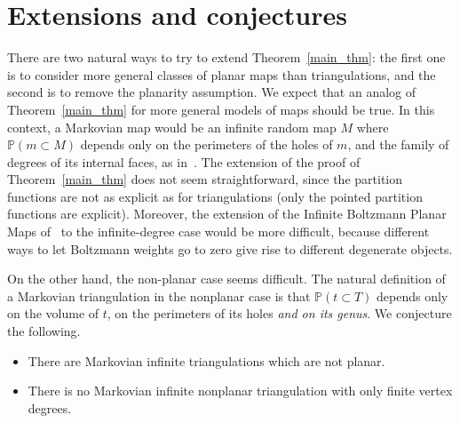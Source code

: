\documentclass[10pt]{amsart}
\theoremstyle{definition}\newtheorem{defi}[theo]{Definition}\newtheorem{rema}[theo]{Remark}\newtheorem{exam}[theo]{Example}\newtheorem{exem}[theo]{Example}\newtheorem{nota}[theo]{Notation}
\renewcommand{\P}{\mathbb{P}}
\begin{document}
\section{Extensions and conjectures}\label{sec_conj}

There are two natural ways to try to extend Theorem~\ref{main_thm}: the first one is to consider more general classes of planar maps than triangulations, and the second is to remove the planarity assumption. We expect that an analog of Theorem~\ref{main_thm} for more general models of maps should be true. In this context, a Markovian map would be an infinite random map $M$ where $\P (m \subset M)$ depends only on the perimeters of the holes of $m$, and the family of degrees of its internal faces, as in~\cite[Theorem~4]{BL20}. The extension of the proof of Theorem~\ref{main_thm} does not seem straightforward, since the partition functions are not as explicit as for triangulations (only the pointed partition functions are explicit). Moreover, the extension of the Infinite Boltzmann Planar Maps of~\cite{BL20} to the infinite-degree case would be more difficult, because different ways to let Boltzmann weights go to zero give rise to different degenerate objects.

On the other hand, the non-planar case seems difficult. The natural definition of a Markovian triangulation in the nonplanar case is that $\P (t \subset T)$ depends only on the volume of $t$, on the perimeters of its holes \emph{and on its genus}. We conjecture the following.

\begin{conj}\leavevmode
\begin{itemize}
\item There are Markovian infinite triangulations which are not planar.
\item There is no Markovian infinite nonplanar triangulation with only finite vertex degrees.
\end{itemize}
\end{conj}
\end{document}
